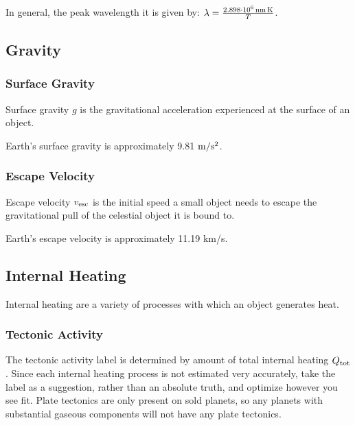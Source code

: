 \documentclass[letterpaper,10pt,english]{sphinxmanual}
\begin{document}
\sphinxAtStartPar
In general, the peak wavelength it is given by: \(\lambda = \frac{2.898 \cdot 10 ^ 6 \,{\rm nm\, K}}{T}\).


\subsection{Gravity}
\label{\detokenize{quantities/surface/gravity/gravity:gravity}}\label{\detokenize{quantities/surface/gravity/gravity::doc}}

\subsubsection{Surface Gravity}
\label{\detokenize{quantities/surface/gravity/surface_gravity:surface-gravity}}\label{\detokenize{quantities/surface/gravity/surface_gravity::doc}}
\sphinxAtStartPar
Surface gravity \(g\) is the gravitational acceleration experienced at
the surface of an object.

\sphinxAtStartPar
Earth’s surface gravity is approximately 9.81 \({\rm m/s^2}\).


\subsubsection{Escape Velocity}
\label{\detokenize{quantities/surface/gravity/escape_velocity:escape-velocity}}\label{\detokenize{quantities/surface/gravity/escape_velocity::doc}}
\sphinxAtStartPar
Escape velocity \(v_{\rm esc}\) is the initial speed a small object needs to escape the gravitational
pull of the celestial object it is bound to.

\sphinxAtStartPar
Earth’s escape velocity is approximately 11.19 km/s.


\subsection{Internal Heating}
\label{\detokenize{quantities/surface/internal_heating/internal_heating:internal-heating}}\label{\detokenize{quantities/surface/internal_heating/internal_heating::doc}}\label{\detokenize{quantities/surface/internal_heating/internal_heating:id1}}
\sphinxAtStartPar
Internal heating are a variety of processes with which an object generates heat.


\subsubsection{Tectonic Activity}
\label{\detokenize{quantities/surface/internal_heating/tectonic_activity:tectonic-activity}}\label{\detokenize{quantities/surface/internal_heating/tectonic_activity::doc}}\label{\detokenize{quantities/surface/internal_heating/tectonic_activity:id1}}
\sphinxAtStartPar
The tectonic activity label is determined by amount of total internal heating \(Q_{\rm tot}\).
Since each internal heating process is not estimated very accurately, take the
label as a suggestion, rather than an absolute truth, and optimize however you see fit.
Plate tectonics are only present on sold planets, so any planets with substantial gaseous
components will not have any plate tectonics.
\end{document}
